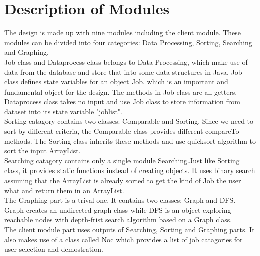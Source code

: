 \documentclass[12pt]{article}
\begin{document}
\section{Description of Modules}
The design is made up with nine modules including the client module. These modules can be divided into four categories: Data Processing, Sorting, Searching and Graphing.\\\newline Job class and Dataprocess class belongs to Data Processing, which make use of data from the database and store that into some data structures in Java. Job class defines state variables for an object Job, which is an important and fundamental object for the design. The methods in Job class are all getters. Dataprocess class takes no input and use Job class to store information from dataset into its state variable "joblist".\\\newline Sorting catagory contains two classes: Comparable and Sorting. Since we need to sort by different criteria, the Comparable class provides different compareTo methods. The Sorting class inherits these methods and use quicksort algorithm to sort the input ArrayList. \\\newline Searching catagory contains only a single module Searching.Just like Sorting class, it provides static functions instead of creating objects. It uses binary search assuming that the ArrayList is already sorted to get the kind of Job the user what and return them in an ArrayList. \\\newline The Graphing part is a trival one. It contains two classes: Graph and DFS. Graph creates an undirected graph class while DFS is an object exploring reachable nodes with depth-frist search algorithm based on a Graph class. \\\newline The client module part uses outputs of Searching, Sorting and Graphing parts. It also makes use of a class called Noc which provides a list of job catagories for user selection and demostration.
\end{document}
